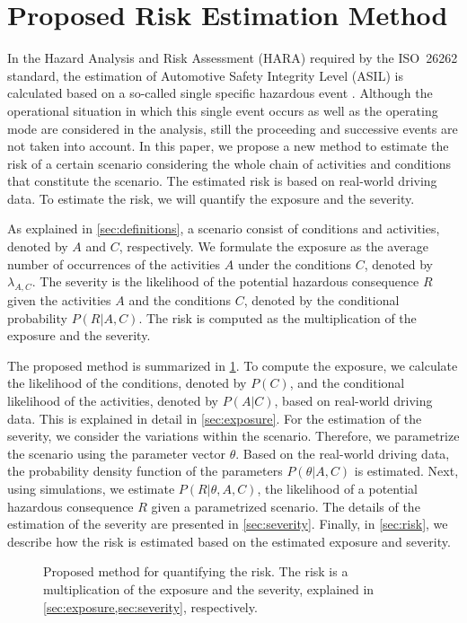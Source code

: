 \section{Proposed Risk Estimation Method}
\label{sec:method}
 
In the Hazard Analysis and Risk Assessment (HARA) required by the ISO~26262 standard, the estimation of Automotive Safety Integrity Level (ASIL) is calculated based on a so-called single specific hazardous event \cite{ISO26262}.
Although the operational situation in which this single event occurs as well as the operating mode are considered in the analysis, still the proceeding and successive events are not taken into account.
In this paper, we propose a new method to estimate the risk of a certain scenario considering the whole chain of activities and conditions that constitute the scenario.
The estimated risk is based on real-world driving data. To estimate the risk, we will quantify the exposure and the severity.

As explained in \cref{sec:definitions}, a scenario consist of conditions and activities, denoted by $A$ and $C$, respectively. We formulate the exposure as the average number of occurrences of the activities $A$ under the conditions $C$, denoted by $\lambda_{A,C}$. The severity is the likelihood of the potential hazardous consequence $R$ given the activities $A$ and the conditions $C$, denoted by the conditional probability $P(R|A,C)$. The risk is computed as the multiplication of the exposure and the severity. 

The proposed method is summarized in \cref{fig:method}. To compute the exposure, we calculate the likelihood of the conditions, denoted by $P(C)$, and the conditional likelihood of the activities, denoted by $P(A|C)$, based on real-world driving data. This is explained in detail in \cref{sec:exposure}. For the estimation of the severity, we consider the variations within the scenario. Therefore, we parametrize the scenario using the parameter vector $\theta$. Based on the real-world driving data, the probability density function of the parameters $P(\theta|A,C)$ is estimated. Next, using simulations, we estimate $P(R|\theta,A,C)$, the likelihood of a potential hazardous consequence $R$ given a parametrized scenario. The details of the estimation of the severity are presented in \cref{sec:severity}. Finally, in \cref{sec:risk}, we describe how the risk is estimated based on the estimated exposure and severity.

\begin{figure}
	\centering
	
	\caption{Proposed method for quantifying the risk. The risk is a multiplication of the exposure and the severity, explained in \cref{sec:exposure,sec:severity}, respectively.}
	\label{fig:method}
\end{figure}

